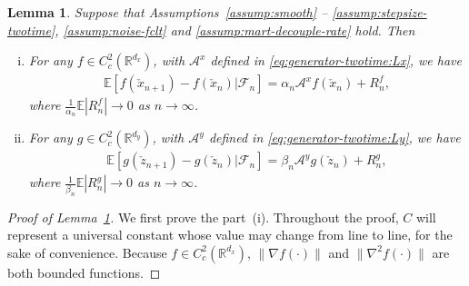 \documentclass[11pt]{article}
\theoremstyle{plain}
\newtheorem{lem}{Lemma}[section]
\theoremstyle{definition}
\def\AM{{\mathcal A}}
\def\FM{{\mathcal F}}
\def\RB{{\mathbb R}}
\def\EB{{\mathbb E}}
\newcommand{\xcheck}{{\check{x}}}
\newcommand{\zcheck}{{\check{z}}}
\begin{document}
\begin{appendix}
\begin{lem}\label{lem:generator-twotime}
    Suppose that Assumptions~\ref{assump:smooth} -- \ref{assump:stepsize-twotime}, \ref{assump:noise-fclt} and \ref{assump:mart-decouple-rate} hold. Then
    \begin{enumerate}[(i)]
        \item For any $f \in C^2_c(\RB^{d_x})$,  with $\AM^x$ defined in \eqref{eq:generator-twotime:Lx}, we have
        \begin{align}\label{eq:generator-twotime:x}
            \EB [ f (\xcheck_{n+1}) - f(\xcheck_{n}) | \FM_{n} ]
            = \alpha_{n} \AM^x f(\xcheck_{n}) + R^f_{n},
        \end{align}
        where $\frac{1}{\alpha_{n}} \EB | R^f_{n} | \to 0$ as $n \to \infty$.
        \item For any $g \in C^2_c(\RB^{d_y})$,  with $\AM^y$ defined in \eqref{eq:generator-twotime:Ly},
        we have
        \begin{align}
            \label{eq:generator-twotime:y}
            \EB [ g (\zcheck_{n+1}) - g(\zcheck_{n}) | \FM_{n} ]
            = \beta_{n} \AM^y g(\zcheck_{n}) + R^g_{n},
        \end{align}
        where $\frac{1}{\beta_{n}} \EB | R^g_{n} | \to 0$ as $n \to \infty$.
    \end{enumerate}
\end{lem}

\begin{proof}[Proof of Lemma~\ref{lem:generator-twotime}]
    We first prove the part~(i). Throughout the proof, $C$ will represent a universal constant whose value may change from line to line, for the sake of convenience.
    Because $f \in C^2_c(\RB^{d_x})$, $\| \nabla f(\cdot) \|$ and $\| \nabla^2 f(\cdot) \|$ are both bounded functions.
    

\end{proof}
\end{appendix}
\end{document}
